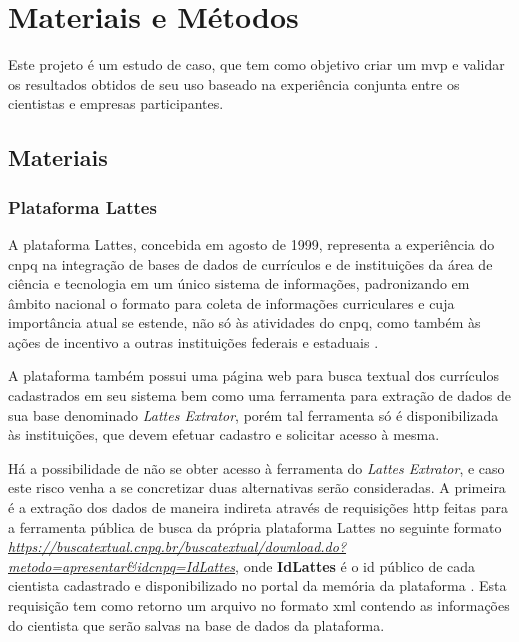 \chapter{Materiais e Métodos}\label{cap:materialemetodos}

Este projeto é um estudo de caso, que tem como objetivo criar um \gls{mvp} e validar os resultados obtidos de seu uso baseado na experiência conjunta entre os cientistas e empresas participantes.

\section{Materiais}\label{sec:materiais}

\subsection{Plataforma Lattes}\label{subsec:lattes}

A plataforma Lattes, concebida em agosto de 1999, representa a experiência do \gls{cnpq} na integração de bases de dados de currículos e de instituições da área de ciência e tecnologia em um único sistema de informações, padronizando em âmbito nacional o formato para coleta de informações curriculares e cuja importância atual se estende, não só às atividades do \gls{cnpq}, como também às ações de incentivo a outras instituições federais e estaduais \cite{Lattes}.

A plataforma também possui uma página web para busca textual dos currículos cadastrados em seu sistema bem como uma ferramenta para extração de dados de sua base denominado \textit{Lattes Extrator}, porém tal ferramenta só é disponibilizada às instituições, que devem efetuar cadastro e solicitar acesso à mesma.

Há a possibilidade de não se obter acesso à ferramenta do \textit{Lattes Extrator}, e caso este risco venha a se concretizar duas alternativas serão consideradas. A primeira é a extração dos dados de maneira indireta através de requisições \gls{http} feitas para a ferramenta pública de busca da própria plataforma Lattes no seguinte formato \textit{\url{https://buscatextual.cnpq.br/buscatextual/download.do?metodo=apresentar&idcnpq=IdLattes}}, onde \textbf{IdLattes} é o id público de cada cientista cadastrado e disponibilizado no portal da memória da plataforma \cite{CnpqMemoria}. Esta requisição tem como retorno um arquivo no formato \gls{xml} contendo as informações do cientista que serão salvas na base de dados da plataforma.

